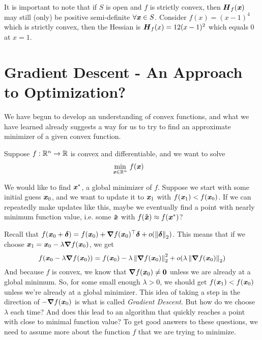 \begin{remark}
It is important to note that if $S$ is open and $f$ is strictly
convex, then $\boldsymbol{{H}}_{f}(\boldsymbol{\mathit{x}})$ may still (only) be positive semi-definite
$\forall \boldsymbol{\mathit{x}} \in S$. Consider $f(x) = (x-1)^4$ which is strictly convex,
then the Hessian is $\boldsymbol{{H}}_{f}(x) = 12(x-1)^2$ which equals 0 at $x = 1$.
\end{remark}

\section{Gradient Descent - An Approach to Optimization?}

We have begun to develop an understanding of convex functions, and
what we have learned already suggests a way for us to try to find an
approximate minimizer of a given convex function.

Suppose $f : \mathbb{R}^n \to \mathbb{R}$ is convex and differentiable, and we want to
solve
\begin{align*}
\min_{\boldsymbol{\mathit{x}} \in \mathbb{R}^n} & \ f(\boldsymbol{\mathit{x}})
\end{align*}

We would like to find $\boldsymbol{\mathit{x}}^*$, a global minimizer of $f$.
Suppose we start with some initial guess  $\boldsymbol{\mathit{x}}_0$,
and we want to update it to $\boldsymbol{\mathit{x}}_1$ with $f(\boldsymbol{\mathit{x}}_1) < f(\boldsymbol{\mathit{x}}_0)$.
If we can repeatedly make updates like this, maybe we eventually
find a point with nearly minimum function value, i.e. some $\boldsymbol{\tilde{\mathit{x}}}$ with $f(\boldsymbol{\tilde{\mathit{x}}}) \approx f(\boldsymbol{\mathit{x}}^*)$?

Recall that $f(\boldsymbol{\mathit{x}}_0+\boldsymbol{\delta}) = f(\boldsymbol{\mathit{x}}_0) + \boldsymbol{\nabla} f(\boldsymbol{\mathit{x}}_0)^\top\boldsymbol{\delta} +
o(\left\| \boldsymbol{\delta} \right\|_2)$.
This means that if we choose
${\boldsymbol{\mathit{x}}_1 = \boldsymbol{\mathit{x}}_0 - \lambda \boldsymbol{\nabla} f(\boldsymbol{\mathit{x}}_0)}$, we get
\[
  f(\boldsymbol{\mathit{x}}_0 - \lambda \boldsymbol{\nabla} f(\boldsymbol{\mathit{x}}_0)) =
  f(\boldsymbol{\mathit{x}}_0) -\lambda \left\| \boldsymbol{\nabla} f(\boldsymbol{\mathit{x}}_0) \right\|_2^2 + o(\lambda \left\| \boldsymbol{\nabla} f(\boldsymbol{\mathit{x}}_0) \right\|_2)
\]
And because $f$ is convex, we know that $\boldsymbol{\nabla} f(\boldsymbol{\mathit{x}}_0) \neq \boldsymbol{0}$
unless we are already at a global minimum.
So, for some small enough $\lambda > 0$, we should get $f(\boldsymbol{\mathit{x}}_1) <
f(\boldsymbol{\mathit{x}}_0)$ unless we're already at a global minimizer.
This idea of taking a step in the direction of $-\boldsymbol{\nabla} f(\boldsymbol{\mathit{x}}_0)$ is
what is called \emph{Gradient Descent}.
But how do we choose $\lambda$ each time? And
does this lead to an algorithm that quickly reaches a point with close to minimal function value?
To get good answers to these questions, we need to assume more about
the function $f$ that we are trying to minimize.

